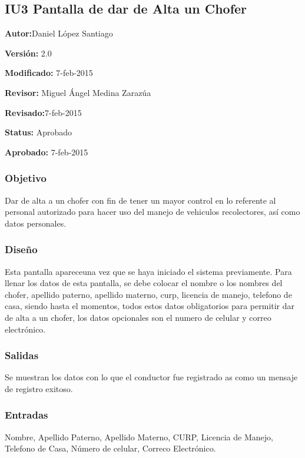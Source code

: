 \subsection{IU3 Pantalla de dar de Alta un Chofer}

\begin{objetivos}
	\item {\bf Autor:}Daniel López Santiago 
	\item {\bf Versión:} 2.0
	\item {\bf Modificado:} 7-feb-2015
	\item {\bf Revisor:} Miguel Ángel Medina Zarazúa 
	\item {\bf Revisado:}7-feb-2015
	\item {\bf Status:} Aprobado
	\item {\bf Aprobado:} 7-feb-2015
\end{objetivos}

\subsubsection{Objetivo}
	Dar de alta a un chofer con fin de tener un mayor control en lo referente al personal autorizado para hacer uso del manejo de vehiculos recolectores, así como datos personales.

\subsubsection{Diseño}
	Esta pantalla apareceuna vez que se haya iniciado el sistema previamente.
	Para llenar los datos de esta pantalla, se debe colocar el nombre o los nombres del chofer, apellido paterno, apellido materno,
	curp, licencia de manejo, telefono de casa, siendo hasta el momentos, todos estos datos obligatorios para permitir dar de alta a un chofer, los datos opcionales son el numero de celular y correo electrónico. 


\subsubsection{Salidas}

Se muestran los datos con lo que el conductor fue registrado as como un mensaje de registro exitoso.

\subsubsection{Entradas}
Nombre, Apellido Paterno, Apellido Materno, CURP, Licencia de Manejo, Telefono de Casa, Número de celular, Correco Electrónico.

